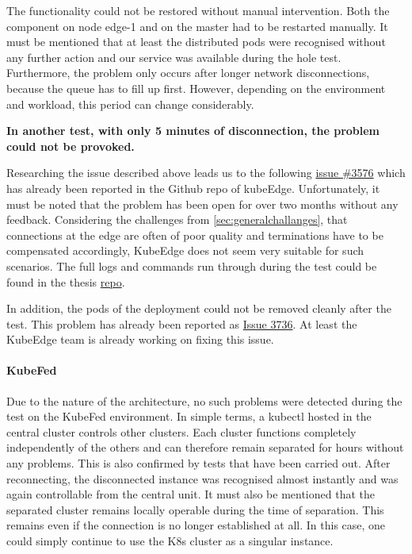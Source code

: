 \documentclass[MSC,Master,english]{twbook}%
\begin{document}
The functionality could not be restored without manual intervention. Both the component on node edge-1 and on the master had to be restarted manually. It must be mentioned that at least the distributed pods were recognised without any further action and our service was available during the hole test. Furthermore, the problem only occurs after longer network disconnections, because the queue has to fill up first. However, depending on the environment and workload, this period can change considerably.\par
\vspace{\baselineskip}
\textbf{In another test, with only 5 minutes of disconnection, the problem could not be provoked.}\par
\vspace{\baselineskip}
Researching the issue described above leads us to the following \hyperref{https://github.com/kubeedge/kubeedge/issues/3567}{}{}{issue \#3576} which has already been reported in the Github repo of kubeEdge. Unfortunately, it must be noted that the problem has been open for over two months without any feedback. Considering the challenges from \autoref{sec:generalchallanges}, that connections at the edge are often of poor quality and terminations have to be compensated accordingly, KubeEdge does not seem very suitable for such scenarios. The full logs and commands run through during the test could be found in the thesis \hyperref{https://github.com/Berndinox/K8sEdge/blob/main/Tests/network/kubeedge-reconnect-issue.md}{}{}{repo}. \par

In addition, the pods of the deployment could not be removed cleanly after the test. This problem has already been reported as \hyperref{https://github.com/kubeedge/kubeedge/issues/3736
}{}{}{Issue 3736}. At least the KubeEdge team is already working on fixing this issue.

\paragraph{KubeFed} Due to the nature of the architecture, no such problems were detected during the test on the KubeFed environment. In simple terms, a kubectl hosted in the central cluster controls other clusters. Each cluster functions completely independently of the others and can therefore remain separated for hours without any problems. This is also confirmed by tests that have been carried out. After reconnecting, the disconnected instance was recognised almost instantly and was again controllable from the central unit. It must also be mentioned that the separated cluster remains locally operable during the time of separation. This remains even if the connection is no longer established at all. In this case, one could simply continue to use the \ac{K8s} cluster as a singular instance.
\end{document}
